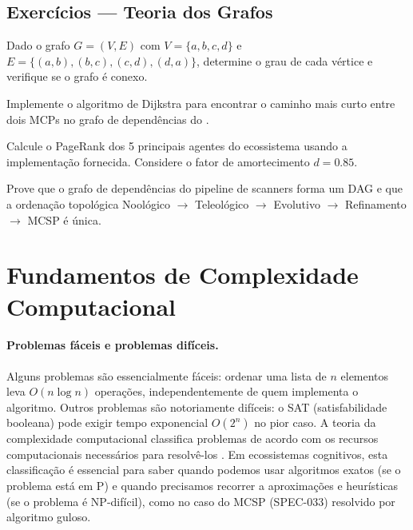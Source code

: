 \subsection{Exercícios — Teoria dos Grafos}

\begin{exercicio}
    Dado o grafo $G = (V, E)$ com $V = \{a, b, c, d\}$ e
    $E = \{(a,b), (b,c), (c,d), (d,a)\}$, determine o grau de cada vértice
    e verifique se o grafo é conexo.
\end{exercicio}

\begin{exercicio}
    Implemente o algoritmo de Dijkstra para encontrar o caminho mais curto
    entre dois MCPs no grafo de dependências do \opencodeeco{}.
\end{exercicio}

\begin{exercicio}
    Calcule o PageRank dos 5 principais agentes do ecossistema usando a
    implementação fornecida. Considere o fator de amortecimento $d = 0.85$.
\end{exercicio}

\begin{exercicio}
    Prove que o grafo de dependências do pipeline de scanners forma um DAG
    e que a ordenação topológica Noológico $\to$ Teleológico $\to$ Evolutivo
    $\to$ Refinamento $\to$ MCSP é única.
\end{exercicio}

\section{Fundamentos de Complexidade Computacional}
\label{sec:complexidade}
\nivelphd

\paragraph{Problemas fáceis e problemas difíceis.} Alguns problemas são
essencialmente fáceis: ordenar uma lista de $n$ elementos leva $O(n \log n)$
operações, independentemente de quem implementa o algoritmo. Outros problemas
são notoriamente difíceis: o SAT (satisfabilidade booleana) pode exigir tempo
exponencial $O(2^n)$ no pior caso. A teoria da complexidade computacional
classifica problemas de acordo com os recursos computacionais necessários para
resolvê-los \cite{russell2020inteligencia, wooldridge2009multiagent}. Em
ecossistemas cognitivos, esta classificação é essencial para saber quando
podemos usar algoritmos exatos (se o problema está em P) e quando precisamos
recorrer a aproximações e heurísticas (se o problema é NP-difícil), como no
caso do MCSP (SPEC-033) resolvido por algoritmo guloso.

